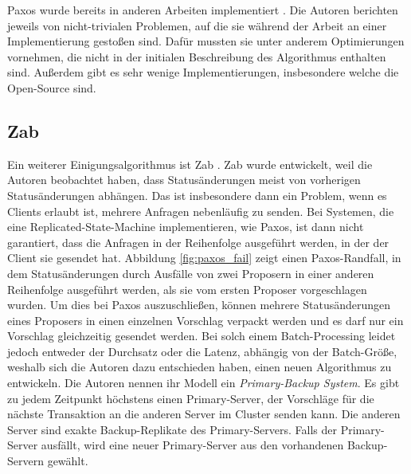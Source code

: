 Paxos wurde bereits in anderen Arbeiten implementiert \cite{paxos-made-complex, paxos-made-live}. Die Autoren berichten jeweils von nicht-trivialen Problemen, auf die sie während der Arbeit an einer Implementierung gestoßen sind. Dafür mussten sie unter anderem Optimierungen vornehmen, die nicht in der initialen Beschreibung des Algorithmus enthalten sind. Außerdem gibt es sehr wenige Implementierungen, insbesondere welche die Open-Source sind.

\subsection{Zab}

Ein weiterer Einigungsalgorithmus ist Zab \cite{zab}. Zab wurde entwickelt, weil die Autoren beobachtet haben, dass Statusänderungen meist von vorherigen Statusänderungen abhängen. Das ist insbesondere dann ein Problem, wenn es Clients erlaubt ist, mehrere Anfragen nebenläufig zu senden. Bei Systemen, die eine Replicated-State-Machine implementieren, wie Paxos, ist dann nicht garantiert, dass die Anfragen in der Reihenfolge ausgeführt werden, in der der Client sie gesendet hat. Abbildung \ref{fig:paxos_fail} zeigt einen Paxos-Randfall, in dem Statusänderungen durch Ausfälle von zwei Proposern in einer anderen Reihenfolge ausgeführt werden, als sie vom ersten Proposer vorgeschlagen wurden. Um dies bei Paxos auszuschließen, können mehrere Statusänderungen eines Proposers in einen einzelnen Vorschlag verpackt werden und es darf nur ein Vorschlag gleichzeitig gesendet werden. Bei solch einem Batch-Processing leidet jedoch entweder der Durchsatz oder die Latenz, abhängig von der Batch-Größe, weshalb sich die Autoren dazu entschieden haben, einen neuen Algorithmus zu entwickeln.
Die Autoren nennen ihr Modell ein \textit{Primary-Backup System}. Es gibt zu jedem Zeitpunkt höchstens einen Primary-Server, der Vorschläge für die nächste Transaktion an die anderen Server im Cluster senden kann. Die anderen Server sind exakte Backup-Replikate des Primary-Servers. Falls der Primary-Server ausfällt, wird eine neuer Primary-Server aus den vorhandenen Backup-Servern gewählt.

